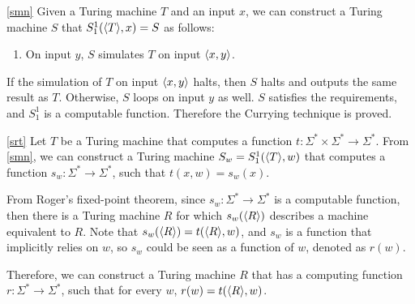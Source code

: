 \documentclass{homework}
\begin{document}
\begin{solution}

  \ref{smn} Given a Turing machine $T$ and an input $x$,
  we can construct a Turing machine $S$ that $S_1^1(\langle T \rangle, x) = S$
  as follows:
  \begin{enumerate}
    \item On input $y$, $S$ simulates $T$ on input $\langle x, y\rangle$.
  \end{enumerate}

  If the simulation of $T$ on input $\langle x, y\rangle$ halts,
  then $S$ halts and outputs the same result as $T$.
  Otherwise, $S$ loops on input $y$ as well.
  $S$ satisfies the requirements, and $S_1^1$ is a computable function.
  Therefore the Currying technique is proved.

  \ref{srt} Let $T$ be a Turing machine that computes a function
  $t : \Sigma^* \times \Sigma^* \to \Sigma^*$. 
  From \cref{smn},
  we can construct a Turing machine $S_w = S_1^1(\langle T \rangle, w)$ that computes a function
  $s_w : \Sigma^* \to \Sigma^*$,
  such that $t(x, w) = s_w(x)$.

  From Roger's fixed-point theorem,
  since $s_w : \Sigma^* \to \Sigma^*$ is a computable
  function, then there is a Turing machine $R$ for which
  $s_w(\langle R \rangle)$ describes a machine equivalent to $R$.
  Note that $s_w(\langle R \rangle) = t(\langle R \rangle, w)$,
  and $s_w$ is a function that implicitly relies on $w$,
  so $s_w$ could be seen as a function of $w$, denoted as $r(w)$.

  Therefore, we can construct a Turing machine $R$ that has a computing function
  $r : \Sigma^* \to \Sigma^*$, such that for every $w$, $r(w) = t(\langle R \rangle, w)$.

\end{solution}
\end{document}
